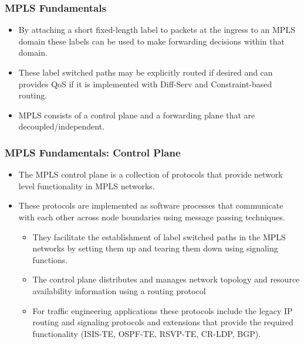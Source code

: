 \documentclass[12pt]{beamer}
\begin{document}
\begin{frame}
    \frametitle{MPLS Fundamentals}
    \begin{itemize}
        \item By attaching a short fixed-length label to packets at the ingress to an MPLS domain these labels can be used to make forwarding decisions within that domain.
        \item These label switched paths may be explicitly routed if desired and can provides QoS if it is implemented with Diff-Serv and Constraint-based routing.
        \item MPLS consists of a control plane and a forwarding plane that are decoupled/independent.
    \end{itemize}
\end{frame}

\begin{frame}
	\frametitle{MPLS Fundamentals: Control Plane}
	\begin{itemize}
	    \item The MPLS control plane is a collection of protocols that provide network level functionality in MPLS networks.
	    \item These protocols are implemented as software processes that communicate with each other across node boundaries using message passing techniques.
    \begin{itemize}
        \item They facilitate the establishment of label switched paths in the MPLS networks by setting them up and tearing them down using signaling functions.
		\item The control plane distributes and manages network topology and resource availability information using a routing protocol
		\item For traffic engineering applications these protocols include the legacy IP routing and signaling protocols and extensions that provide the required functionality (ISIS-TE, OSPF-TE, RSVP-TE, CR-LDP, BGP).
	\end{itemize}
    \end{itemize}
\end{frame}
\end{document}
